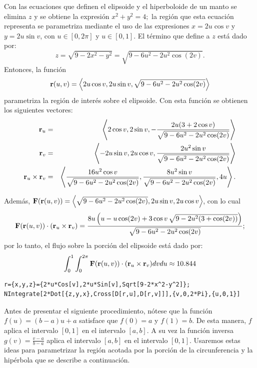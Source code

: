 \begin{parrafonumerado}
Con las ecuaciones que definen el elipsoide y el hiperboloide de un manto se elimina $z$ y se obtiene la expresión
$x^2+y^2=4;$ la región que esta ecuación representa se parametriza mediante el uso de las expresiones
$x=2u\cos v$ y $y=2u \sin v$, con $u \in [0,2\pi]$ y $u\in [0,1]$.
El término que define a $z$ está dado por:
\[z =\sqrt{9-2x^2-y^2} = \sqrt{9-6u^2-2u^2 \cos(2v)}.\]
Entonces, la función
\[{\bf r}(u,v) = \left \langle 2u\cos v,2u \sin v ,\sqrt{9-6u^2-2u^2 \cos(2v)} \right\rangle\]
parametriza la región de interés sobre el elipsoide. Con esta función se obtienen los siguientes vectores:
\begin{eqnarray*}
{\bf r}_u &=& \left \langle 2\cos v,2 \sin v , -\frac{2u(3+2\cos v)}{\sqrt{9-6u^2-2u^2 \cos(2v)}} \right\rangle \\
{\bf r}_v &=& \left \langle -2u\sin v,2u \cos v , \frac{2u^2 \sin v}{\sqrt{9-6u^2-2u^2 \cos(2v)}} \right\rangle \\
{\bf r}_u \times {\bf r}_v &=& \left \langle \frac{16u^2 \cos v}{\sqrt{9-6u^2-2u^2 \cos(2v)}}, \frac{8u^2 \sin v}{\sqrt{9-6u^2-2u^2 \cos(2v)}}, 4u \right\rangle.
\end{eqnarray*}

Además,
${\bf F}({\bf r}(u,v) ) = \left \langle \sqrt{9-6u^2-2u^2 \cos(2v)},2u \sin v , 2u\cos v \right\rangle \!$,
con lo cual
\begin{gather*}
{\bf F}({\bf r}(u,v) ) \cdot ({\bf r}_u \times {\bf r}_v)=
\frac{ 8u \left (u-u \cos (2v) +3 \cos v \, \sqrt{9-2u^2(3+\cos(2v))}\right )}{\sqrt{9-6u^2-2u^2 \cos(2v)}};
\end{gather*}
por lo tanto, el flujo sobre la porción del elipsoide está dado por:
\begin{equation} \label{ejercicio6e}
\int_0^1 \int_0^{2\pi} {\bf F}({\bf r}(u,v) ) \cdot ({\bf r}_u \times {\bf r}_v) dvdu \approx 10.844
\end{equation}

\begin{tcolorbox}[title=\bf Instrucción \verb"Mathematica"]\begin{Verbatim}[formatcom=\letraverbatim]
r={x,y,z}={2*u*Cos[v],2*u*Sin[v],Sqrt[9-2*x^2-y^2]};
NIntegrate[2*Dot[{z,y,x},Cross[D[r,u],D[r,v]]],{v,0,2*Pi},{u,0,1}]
\end{Verbatim}
\end{tcolorbox}

Antes de presentar el siguiente procedimiento, nótese que la función $f(u)= (b-a)u+a$ satisface que $f(0)=a$ y $f(1)=b$.
De esta manera, $f$ aplica el intervalo $[0,1]$ en el intervalo $[a,b]$. A su vez la función inversa
$g(v)= \frac{v-a}{b-a}$ aplica el intervalo $[a,b]$ en el intervalo $[0,1]$.
Usaremos estas ideas para parametrizar la región acotada por la porción de la circunferencia y la hipérbola que se des\-cribe a continuación.


\end{parrafonumerado}
